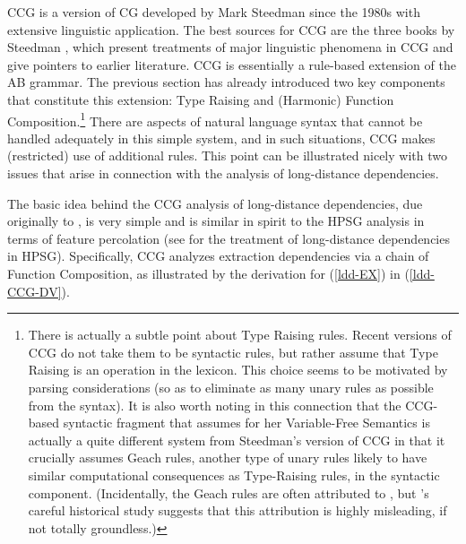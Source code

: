 \documentclass[output=paper
                ,modfonts
                ,nonflat
	        ,collection
	        ,collectionchapter
	        ,collectiontoclongg
 	        ,biblatex
                ,babelshorthands
                ,newtxmath
                ,draftmode
                ,colorlinks, citecolor=brown
]{./langsci/langscibook}
\begin{document}
CCG is a version of CG developed by Mark Steedman since the 1980s with
extensive linguistic application. The best sources for CCG are the
three books by Steedman \citep{Steedman97a,Steedman2000a-u,steedman2012},
which present treatments of major linguistic phenomena in CCG and
give pointers to earlier literature. CCG is essentially a rule-based
extension of the AB grammar. The previous
section has already introduced two key components that constitute this extension: Type
Raising and (Harmonic) Function Composition.\footnote{There is
actually a subtle point about Type Raising rules. Recent
versions of CCG \citep{steedman2012} do not take them to be syntactic rules,
but rather assume that Type Raising is an operation in the lexicon.
This choice seems to be motivated by 
parsing considerations (so as to eliminate as  many unary rules as
possible from the syntax). It is also worth noting in this
connection that the CCG-based syntactic fragment that
\citet{jacobson1999a,jacobson2000a} assumes for her Variable-Free Semantics
is actually a quite different system from Steedman's version of CCG in
that it crucially assumes Geach rules, another type of unary rules
likely to have similar computational consequences as Type-Raising rules, in the syntactic
component. (Incidentally,  the Geach rules are often attributed
to \citealt{Geach70a},  but \citeauthor{Humberstone2005}'s \citeyear{Humberstone2005} careful
historical study suggests that this attribution is highly misleading, if not
totally groundless.)} There are 
aspects of natural language syntax that cannot 
be handled adequately in this simple system, and in such situations,
CCG makes (restricted) use of additional rules. This point can be
illustrated nicely with two issues that arise in connection with the
analysis of long-distance dependencies.

The basic idea behind the CCG analysis of long-distance dependencies,
due originally to \citet{AS82a}, is very simple and is similar in spirit to
the HPSG analysis in terms of \slasch feature percolation (see
for the treatment of long-distance dependencies in HPSG). Specifically,
CCG analyzes extraction dependencies via a chain of Function
Composition, as illustrated by the derivation for (\ref{ldd-EX}) in (\ref{ldd-CCG-DV}).
\end{document}
